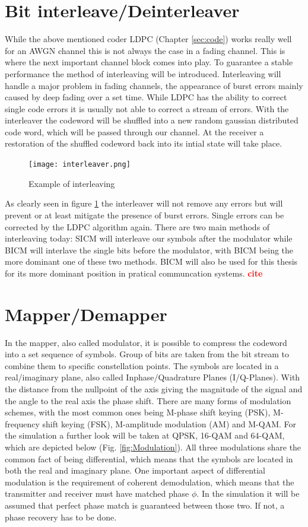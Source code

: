 \documentclass[12pt,oneside, reqno]{report}
\newcommand\boldred[1]{\textcolor{red}{\textbf{#1}}}
\begin{document}
\section{Bit interleave/Deinterleaver}
\label{sec:BIC}
While the above mentioned coder \gls{LDPC}  (Chapter \ref{sec:code}) works really well for an AWGN channel this is not always the case in a fading channel. This is where the next important channel block comes into play. To guarantee a stable performance the method of interleaving will be introduced. Interleaving will handle a major problem in fading channels, the appearance of burst errors mainly caused by deep fading over a set time. While \gls{LDPC} has the ability to correct single code errors it is usually not able to correct a stream of errors. With the interleaver the codeword will be shuffled into a new random gaussian distributed code word, which will be passed through our channel. At the receiver a restoration of the shuffled codeword back into its intial state will take place.
\begin{figure}[H]
	\centering
	\texttt{[image: interleaver.png]}
	\caption{Example of interleaving}
	\label{fig:interleaver}
\end{figure}
As clearly seen in figure \ref{fig:interleaver} the interleaver will not remove any errors but will prevent or at least mitigate the presence of burst errors. Single errors can be corrected by the LDPC algorithm again.
There are two main methods of interleaving today: 
\gls{SICM} will interleave our symbols after the modulator while \gls{BICM} will interlave the single bits before the modulator, with \gls{BICM} being the more dominant one of these two methods. BICM will also be used for this thesis for its more dominant position in pratical communcation systems. \boldred{cite}
\newpage

\section{Mapper/Demapper}
\label{sec:mod}
In the mapper, also called modulator, it is possible to compress the codeword into a set sequence of symbols. Group of bits are taken from the bit stream to combine them to specific constellation points. The symbols are located in a real/imaginary plane, also called Inphase/Quadrature Planes (I/Q-Planes). With the distance from the nullpoint of the axis giving the magnitude of the signal and the angle to the real axis the phase shift. 
\newline
There are many forms of modulation schemes, with the most common ones being M-phase shift keying (PSK), M-frequency shift keying (FSK), M-amplitude modulation (AM) and M-\gls{QAM}. For the simulation a further look will be taken at \gls{QPSK}, 16-\gls{QAM} and 64-\gls{QAM}, which are depicted below (Fig. \ref{fig:Modulation}). All three modulations share the common fact of being differential, which means that the symbols are located in both the real and imaginary plane. One important aspect of differential modulation is the requirement of coherent demodulation, which means that the transmitter and receiver must have matched phase $\phi$. In the simulation it will be assumed that perfect phase match is guaranteed between those two. If not, a phase recovery has to be done.  
\end{document}
